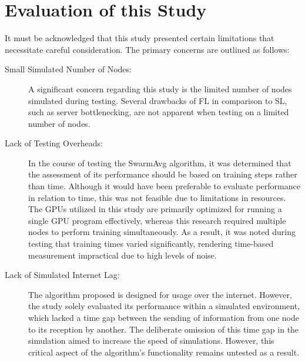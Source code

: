 \section{Evaluation of this Study}
It must be acknowledged that this study presented certain limitations that necessitate careful consideration. The primary concerns are outlined as follows:

\begin{description}
	\item[Small Simulated Number of Nodes: ] A significant concern regarding this study is the limited number of nodes simulated during testing. Several drawbacks of FL in comparison to SL, such as server bottlenecking, are not apparent when testing on a limited number of nodes.
	
	\item[Lack of Testing Overheads: ] In the course of testing the SwarmAvg algorithm, it was determined that the assessment of its performance should be based on training steps rather than time. Although it would have been preferable to evaluate performance in relation to time, this was not feasible due to limitations in resources. The GPUs utilized in this study are primarily optimized for running a single GPU program effectively, whereas this research required multiple nodes to perform training simultaneously. As a result, it was noted during testing that training times varied significantly, rendering time-based measurement impractical due to high levels of noise.
	
	\item[Lack of Simulated Internet Lag: ] The algorithm proposed is designed for usage over the internet. However, the study solely evaluated its performance within a simulated environment, which lacked a time gap between the sending of information from one node to its reception by another. The deliberate omission of this time gap in the simulation aimed to increase the speed of simulations. However, this critical aspect of the algorithm's functionality remains untested as a result.
\end{description}